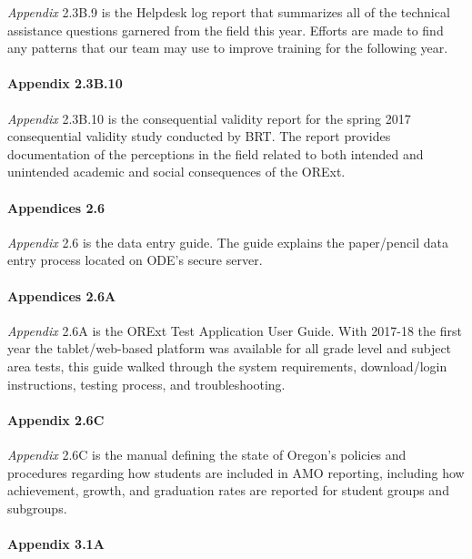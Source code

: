 \documentclass[]{article}
\let\oldparagraph\paragraph
\renewcommand{\paragraph}[1]{\oldparagraph{#1}\mbox{}}
\begin{document}
\emph{Appendix} 2.3B.9 is the Helpdesk log report that summarizes all of
the technical assistance questions garnered from the field this year.
Efforts are made to find any patterns that our team may use to improve
training for the following year.

\hypertarget{appendix-2.3b.10}{%
\paragraph{Appendix 2.3B.10}\label{appendix-2.3b.10}}

\emph{Appendix} 2.3B.10 is the consequential validity report for the
spring 2017 consequential validity study conducted by BRT. The report
provides documentation of the perceptions in the field related to both
intended and unintended academic and social consequences of the ORExt.

\hypertarget{appendices-2.6}{%
\paragraph{Appendices 2.6}\label{appendices-2.6}}

\emph{Appendix} 2.6 is the data entry guide. The guide explains the
paper/pencil data entry process located on ODE's secure server.

\hypertarget{appendices-2.6a}{%
\paragraph{Appendices 2.6A}\label{appendices-2.6a}}

\emph{Appendix} 2.6A is the ORExt Test Application User Guide. With
2017-18 the first year the tablet/web-based platform was available for
all grade level and subject area tests, this guide walked through the
system requirements, download/login instructions, testing process, and
troubleshooting.

\hypertarget{appendix-2.6c}{%
\paragraph{Appendix 2.6C}\label{appendix-2.6c}}

\emph{Appendix} 2.6C is the manual defining the state of Oregon's
policies and procedures regarding how students are included in AMO
reporting, including how achievement, growth, and graduation rates are
reported for student groups and subgroups.

\hypertarget{appendix-3.1a}{%
\paragraph{Appendix 3.1A}\label{appendix-3.1a}}
\end{document}
